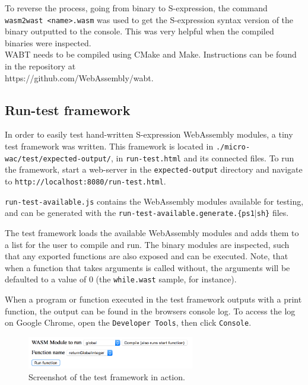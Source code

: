 \documentclass[a4paper]{article}
\begin{document}
To reverse the process, going from binary to S-expression, the command \texttt{wasm2wast <name>.wasm} was used to get the S-expression syntax version of the binary outputted to the console. This was very helpful when the compiled binaries were inspected.\\

\noindent WABT needs to be compiled using CMake and Make. Instructions can be found in the repository at\\https://github.com/WebAssembly/wabt.

\subsection{Run-test framework}
\label{sec:peripherals:run-test-framework}
In order to easily test hand-written S-expression WebAssembly modules, a tiny test framework was written. This framework is located in \texttt{./micro-wac/test/expected-output/}, in \texttt{run-test.html} and its connected files. To run the framework, start a web-server in the \texttt{expected-output} directory and navigate to \texttt{http://localhost:8080/run-test.html}.

\texttt{run-test-available.js} contains the WebAssembly modules available for testing, and can be generated with the \texttt{run-test-available.generate.\{ps1$|$sh\}} files.

The test framework loads the available WebAssembly modules and adds them to a list for the user to compile and run. The binary modules are inspected, such that any exported functions are also exposed and can be executed. Note, that when a function that takes arguments is called without, the arguments will be defaulted to a value of 0 (the \texttt{while.wast} sample, for instance).

When a program or function executed in the test framework outputs with a print function, the output can be found in the browsers console log. To access the log on Google Chrome, open the \texttt{Developer Tools}, then click \texttt{Console}.

\begin{figure}[H]
	\includegraphics[width=0.65\textwidth]{WasmTestFrameworkScreenshot}
	\centering
	\caption{Screenshot of the test framework in action.}
\end{figure}
\end{document}
